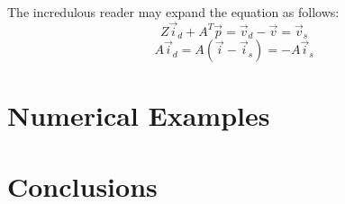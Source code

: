 \documentclass{comjnl}
\begin{document}
The incredulous reader may expand the equation as follows:
$$ Z\vec{i}_d + A^T\vec{p} = \vec{v}_d - \vec{v} = \vec{v}_s $$
$$ A\vec{i}_d = A(\vec{i}-\vec{i}_s) = - A\vec{i}_s  $$

\section{Numerical Examples}


\section{Conclusions}
\label{Conclusions}


\nocite{*}



\end{document}
